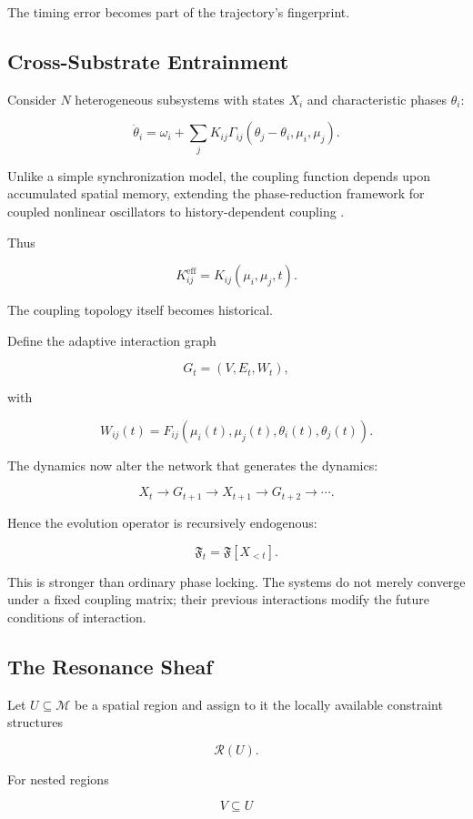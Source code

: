 \documentclass[11pt]{article}
\begin{document}
The timing error becomes part of the trajectory's fingerprint.

\subsection{Cross-Substrate Entrainment}

Consider $N$ heterogeneous subsystems with states $X_i$ and characteristic phases $\theta_i$:

\[
\dot{\theta}_i
=
\omega_i
+
\sum_j
K_{ij}
\Gamma_{ij}
(\theta_j-\theta_i,\mu_i,\mu_j).
\]

Unlike a simple synchronization model, the coupling function depends upon accumulated spatial memory, extending the phase-reduction framework for coupled nonlinear oscillators to history-dependent coupling \cite{nakao2016phase}.

Thus

\[
K_{ij}^{\mathrm{eff}}
=
K_{ij}(\mu_i,\mu_j,t).
\]

The coupling topology itself becomes historical.

Define the adaptive interaction graph

\[
G_t=(V,E_t,W_t),
\]

with

\[
W_{ij}(t)
=
F_{ij}
\left(
\mu_i(t),
\mu_j(t),
\theta_i(t),
\theta_j(t)
\right).
\]

The dynamics now alter the network that generates the dynamics:

\[
X_t
\rightarrow
G_{t+1}
\rightarrow
X_{t+1}
\rightarrow
G_{t+2}
\rightarrow\cdots.
\]

Hence the evolution operator is recursively endogenous:

\[
\mathfrak{F}_t
=
\mathfrak{F}[X_{<t}].
\]

This is stronger than ordinary phase locking. The systems do not merely converge under a fixed coupling matrix; their previous interactions modify the future conditions of interaction.

\subsection{The Resonance Sheaf}

Let $U\subseteq\mathcal{M}$ be a spatial region and assign to it the locally available constraint structures

\[
\mathscr{R}(U).
\]

For nested regions

\[
V\subseteq U
\]
\end{document}
